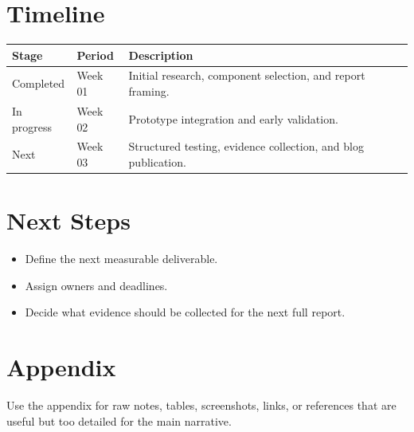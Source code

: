 \documentclass[11pt,a4paper]{article}
\begin{document}
\section{Timeline}
\begin{tabularx}{\textwidth}{@{}B{0.18\textwidth} L{0.22\textwidth} Y@{}}
\toprule
Stage & Period & Description \\
\midrule
Completed & Week 01 & Initial research, component selection, and report framing. \\
In progress & Week 02 & Prototype integration and early validation. \\
Next & Week 03 & Structured testing, evidence collection, and blog publication. \\
\bottomrule
\end{tabularx}

\section{Next Steps}
\begin{itemize}
  \item Define the next measurable deliverable.
  \item Assign owners and deadlines.
  \item Decide what evidence should be collected for the next full report.
\end{itemize}

\section{Appendix}
Use the appendix for raw notes, tables, screenshots, links, or references that are useful
but too detailed for the main narrative.
\end{document}
